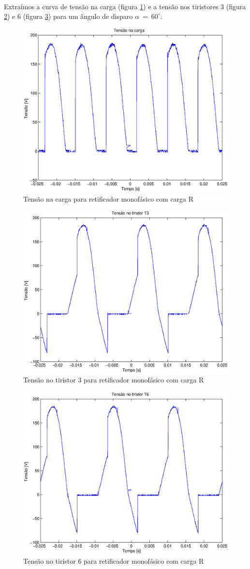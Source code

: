 \documentclass{article}
\begin{document}
Extraímos a curva de tensão na carga (figura \ref{fig:rvo}) e a tensão nos tiristores 3 (figura \ref{fig:rvt3}) e 6 (figura \ref{fig:rvt6}) para um ângulo de disparo $\alpha\ =\ 60^\circ$.
\begin{figure}[H]
	\centering
	\includegraphics[width=0.7\linewidth]{dados/R/r_vo}
	\caption{Tensão na carga para retificador monofásico com carga R}
	\label{fig:rvo}
\end{figure}
\begin{figure}[H]
	\centering
	\includegraphics[width=0.7\linewidth]{dados/R/r_vt3}
	\caption{Tensão no tiristor 3 para retificador monofásico com carga R}
	\label{fig:rvt3}
\end{figure}
\begin{figure}[H]
	\centering
	\includegraphics[width=0.7\linewidth]{dados/R/r_vt6}
	\caption{Tensão no tiristor 6 para retificador monofásico com carga R}
	\label{fig:rvt6}
\end{figure}
\end{document}
